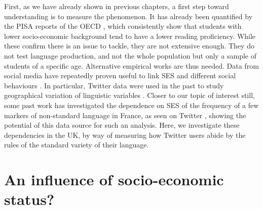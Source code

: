 \documentclass[../thesis.tex]{subfiles}
\begin{document}
First, as we have already shown in previous chapters, a first step toward understanding
is to measure the phenomenon. It has already been quantified by the PISA reports of the
OECD \cite{OECDWhereAll2019}, which consistently show that students with lower
socio-economic background tend to have a lower reading proficiency. While these confirm
there is an issue to tackle, they are not extensive enough. They do not test language
production, and not the whole population but only a sample of students of a specific
age. Alternative empirical works are thus needed. Data from social media have repeatedly
proven useful to link \ac{SES} and different social behaviours
\cite{GaoComputationalSocioeconomics2019}. In particular, Twitter data were used in the
past to study geographical variation of linguistic variables
\cite{EisensteinDiffusionLexical2014}. Closer to our topic of interest still, some past
work has investigated the dependence on \ac{SES} of the frequency of a few markers of
non-standard language in France, as seen on Twitter
\cite{AbitbolSocioeconomicDependencies2018}, showing the potential of this data source
for such an analysis. Here, we investigate these dependencies in the UK, by way of
measuring how Twitter users abide by the rules of the standard variety of their
language.



\section{An influence of socio-economic status?}
\end{document}

